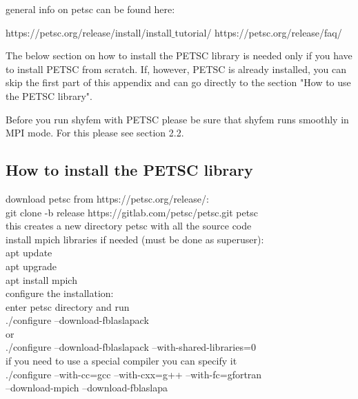 general info on petsc can be found here: 

	https://petsc.org/release/install/install$\_$tutorial/
	https://petsc.org/release/faq/

The below section on how to install the PETSC library is needed only if you have
to install PETSC from scratch. If, however, PETSC is already installed,
you can skip the first part of this appendix and can go directly to
the section "How to use the PETSC library".

Before you run shyfem with PETSC please be sure that shyfem runs
smoothly in MPI mode. For this please see section 2.2.

\subsection{How to install the PETSC library}


download petsc from https://petsc.org/release/:\\

	git clone -b release https://gitlab.com/petsc/petsc.git petsc\\

	this creates a new directory petsc with all the source code\\

install mpich libraries if needed (must be done as superuser):\\

	apt update\\
	apt upgrade\\
	apt install mpich\\

configure the installation:\\

	enter petsc directory and run\\

	./configure --download-fblaslapack\\

	or\\

	./configure --download-fblaslapack --with-shared-libraries=0\\

	if you need to use a special compiler you can specify it\\

	./configure --with-cc=gcc --with-cxx=g++ --with-fc=gfortran \ \\
		--download-mpich --download-fblaslapa\\


